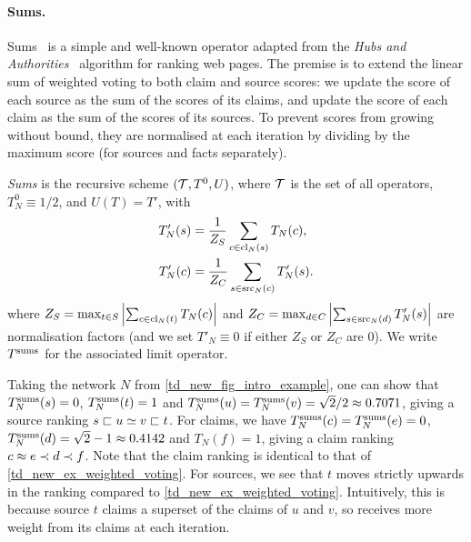 \paragraph{Sums.}

Sums~\cite{pasternack2010} is a simple and well-known operator adapted from the
\emph{Hubs and Authorities}~\cite{kleinberg1999} algorithm for ranking web
pages. The premise is to extend the linear sum of weighted voting to both claim
and source scores: we update the score of each source as the sum of the scores
of its claims, and update the score of each claim as the sum of the scores of
its sources. To prevent scores from growing without bound, they are normalised
at each iteration by dividing by the maximum score (for sources and facts
separately).

\begin{definition}
    \emph{Sums} is the recursive scheme $(\mathcal{T}, T^0, U)$, where $\mathcal{T}$ is the set
    of all operators, $T^0_N \equiv 1 / 2$, and $U(T) = T'$, with
    \begin{align*}
        T'_N(s) &=
            \frac{1}{Z_S}
            \sum_{c \in \operatorname{cl}_N(s)}{
                T_N(c)
            },
        \\
        T'_N(c) &=
            \frac{1}{Z_C}
            \sum_{s \in \operatorname{src}_N(c)}{
                T'_N(s)
            }.
    \end{align*}
    where $
        Z_S = \max_{t \in S}{
            \left|
                \sum_{c \in \operatorname{cl}_N(t)}{
                    T_N(c)
                }
            \right|
        }
    $ and $
        Z_C = \max_{d \in C}{
            \left|
                \sum_{s \in \operatorname{src}_N(d)}{
                    T'_N(s)
                }
            \right|
        }
    $ are normalisation factors (and we set $T'_N \equiv 0$ if either $Z_S$ or
    $Z_C$ are 0). We write $T^{\operatorname{sums}}$ for the associated limit operator.
\end{definition}

Taking the network $N$ from \cref{td_new_fig_intro_example}, one can show that
$T^{\operatorname{sums}}_N(s) = 0$, $T^{\operatorname{sums}}_N(t) = 1$ and $T^{\operatorname{sums}}_N(u) = T^{\operatorname{sums}}_N(v) = \sqrt{2} / 2
\approx 0.7071$, giving a source ranking $s \sqsubset u \simeq v \sqsubset t$.  For claims,
we have $T^{\operatorname{sums}}_N(c) = T^{\operatorname{sums}}_N(e) = 0$, $T^{\operatorname{sums}}_N(d) = \sqrt{2} - 1 \approx
0.4142$ and $T_N(f) = 1$, giving a claim ranking $c \approx e \prec d \prec f$. Note
that the claim ranking is identical to that of
\cref{td_new_ex_weighted_voting}. For sources, we see that $t$ moves strictly
upwards in the ranking compared to \cref{td_new_ex_weighted_voting}.
Intuitively, this is because source $t$ claims a superset of the claims of $u$
and $v$, so receives more weight from its claims at each iteration.

